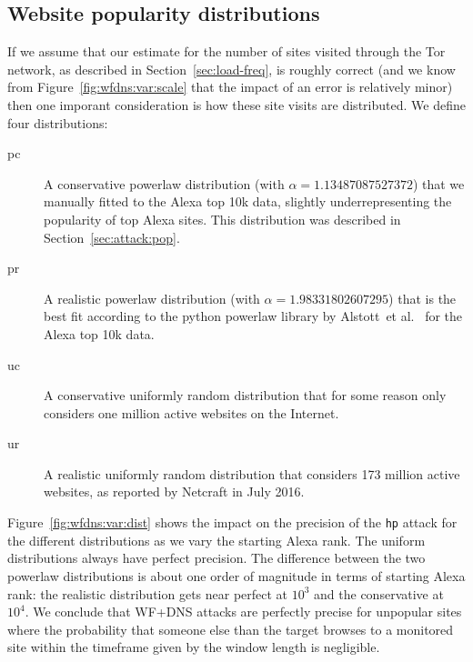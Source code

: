 \subsection{Website popularity distributions}
If we assume that our estimate for the number of sites visited through the Tor
network, as described in Section~\ref{sec:load-freq}, is roughly correct
(and we know from Figure~\ref{fig:wfdns:var:scale} that the impact of an error
is relatively minor) then one imporant consideration is how
these site visits are distributed. We define four distributions:
\begin{description}
	\item[pc] A conservative powerlaw distribution
	(with $\alpha=1.13487087527372$)
	that we manually fitted to the Alexa top 10k data,
	slightly underrepresenting the popularity of top Alexa sites.
	This distribution was described in Section~\ref{sec:attack:pop}.
	\item[pr] A realistic powerlaw distribution
	(with $\alpha=1.98331802607295$)
	that is the best fit according to
	the python powerlaw library by Alstott~et al.~\cite{powerlaw} for the Alexa
	top 10k data.
	\item[uc] A conservative uniformly random distribution that for some reason
	only considers one million active websites on the Internet.
	\item[ur] A realistic uniformly random distribution that considers 173 million active websites, as reported by Netcraft in July 2016.
\end{description}
Figure~\ref{fig:wfdns:var:dist} shows the impact on the precision of the
\texttt{hp} attack for the different distributions as we vary the starting
Alexa rank. The uniform distributions always have perfect precision.
The difference between the two powerlaw distributions is about one order of
magnitude in terms of starting Alexa rank: the realistic distribution gets
near perfect at $10^3$ and the conservative at $10^4$.
We conclude that WF+DNS attacks are perfectly precise for unpopular sites
where the probability that someone else than the target browses to a monitored
site within the timeframe given by the window length is negligible.


